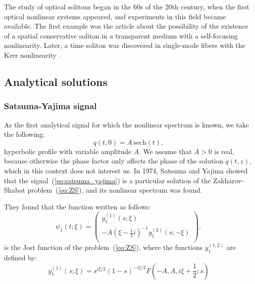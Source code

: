 The study of optical solitons began in the 60s of the 20th century, when the first optical nonlinear systems appeared, and experiments in this field became available. The first example was the article \cite{askaryan1962en} about the possibility of the existence of a spatial conservative soliton in a transparent medium with a self-focusing nonlinearity. Later, a time soliton was discovered in single-mode fibers with the Kerr nonlinearity \cite{hasegawa1973}.


\subsection{Analytical solutions}
\subsubsection{Satsuma-Yajima signal}

As the first analytical signal for which the nonlinear spectrum is known, we take the following:
\begin{equation}
    q(t, 0) = A \ \mathrm{sech}(t) {,}
    \label{eq:satsuma_yajima}
\end{equation}
hyperbolic profile with variable amplitude $ A $. We assume that $ A> 0 $ is real, because otherwise the phase factor only affects the phase of the solution $q (t, z)$, which in this context does not interest us. In 1974, Satsuma and Yajima showed that the signal~(\ref{eq:satsuma_yajima}) is a particular solution of the Zakharov-Shabat problem~(\ref{eq:ZS}), and its nonlinear spectrum was found.

They found that the function written as follows:
\begin{equation}
    \psi_1(t; \xi) =
    \begin{pmatrix}
        y_1^{(1)}(s; \xi) \\
        -A(\xi - \frac{1}{2}i)^{-1} y_1^{(2)}(s; -\xi) \\
    \end{pmatrix} {,}
\end{equation}
is the Jost function of the problem~(\ref{eq:ZS}), where the functions $ y_1^{(1,2)} $ are defined by:
\begin{equation}
    y_1^{(1)} (s; \xi) = s^{i\xi/2}(1 - s)^{-i\xi/2} F \left(-A, A, i\xi + \frac{1}{2}; s\right)
\end{equation}

